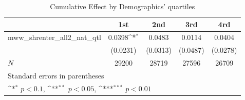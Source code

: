 \begin{table}[htbp]\centering
\def\sym#1{\ifmmode^{#1}\else\(^{#1}\)\fi}
\caption{Cumulative Effect by Demographics' quartiles}
\begin{tabular}{l*{4}{c}}
\hline\hline
            &\multicolumn{1}{c}{1st}&\multicolumn{1}{c}{2nd}&\multicolumn{1}{c}{3rd}&\multicolumn{1}{c}{4rd}\\
\hline
mww\_shrenter\_all2\_nat\_qtl&      0.0398\sym{*}  &      0.0483         &      0.0114         &      0.0404         \\
            &    (0.0231)         &    (0.0313)         &    (0.0487)         &    (0.0278)         \\
\hline
\(N\)       &       29200         &       28719         &       27596         &       26709         \\
\hline\hline
\multicolumn{5}{l}{\footnotesize Standard errors in parentheses}\\
\multicolumn{5}{l}{\footnotesize \sym{*} \(p<0.1\), \sym{**} \(p<0.05\), \sym{***} \(p<0.01\)}\\
\end{tabular}
\end{table}
